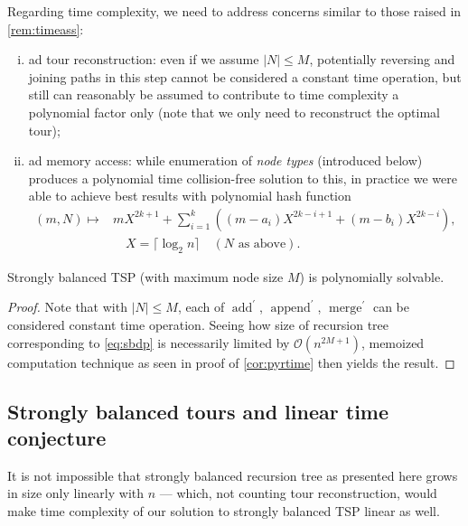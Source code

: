 \documentclass[index=totoc,bibliography=totoc]{scrartcl}
\newcommand{\annotation}[1]{\marginpar{\small\itshape\color{green}#1}}
\numberwithin{equation}{section}
\numberwithin{figure}{section}
\numberwithin{table}{section}
\let\defstyle\itshape
\begin{document}
Regarding time complexity, we need to address concerns similar to
those raised in
\cref{rem:timeass}:
\begin{enumerate}[(i)]
  \item
    ad tour reconstruction:
    even if we assume $\left|N\right| \leq M$,
    potentially reversing and joining paths
    in this step cannot be considered a constant time operation,
    but still can reasonably be assumed to contribute to time complexity
    a polynomial factor only (note that we only need to reconstruct the optimal tour);
  \item
    ad memory access:
    while enumeration of {\defstyle node types} (introduced below) produces
    a polynomial time collision-free solution to this,
    in practice we were able to achieve best results with polynomial hash function
    \annotation{correct this!}
    \begin{align*}
      \left(m,N\right) \mapsto & mX^{2k+1}
        + \sum_{i=1}^k\left((m-a_i)X^{2k-i+1} + (m-b_i)X^{2k-i}\right),
      \\
      & \quad X = \lceil\log_2 n\rceil \quad (N \text{\ as above}).
    \end{align*}
\end{enumerate}

\begin{corollary}
\label{cor:sbtime}
  Strongly balanced TSP (with maximum node size $M$) is polynomially solvable.
\end{corollary}
\begin{proof}
  Note that with $\left|N\right| \leq M$, each of
  $\operatorname{add}^\prime$, $\operatorname{append}^\prime$,
  $\operatorname{merge}^\prime$ can be considered constant time
  operation.
  Seeing how size of recursion tree corresponding to \cref{eq:sbdp} is
  necessarily limited by $\mathcal{O}\left(n^{2M+1}\right)$,
  memoized computation technique as seen in proof of \cref{cor:pyrtime}
  then yields the result.
\end{proof}

\subsection{Strongly balanced tours and linear time conjecture}

It is not impossible that strongly balanced recursion tree as presented
here grows in size only linearly with $n$ --- which, not counting tour
reconstruction, would make time complexity of our solution to strongly
balanced TSP linear as well.
\end{document}
